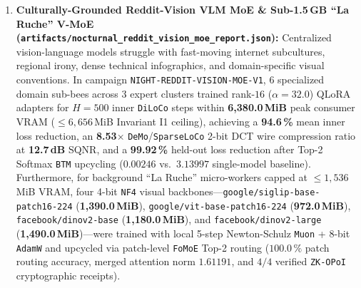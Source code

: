 \documentclass[11pt,a4paper]{article}
\begin{document}
\begin{enumerate}[leftmargin=1.8em]
    \item \textbf{Culturally-Grounded Reddit-Vision VLM MoE \& Sub-1.5\,GB ``La Ruche'' V-MoE (\texttt{artifacts/\allowbreak nocturnal\_\allowbreak reddit\_\allowbreak vision\_\allowbreak moe\_\allowbreak report.json}):}
    Centralized vision-language models struggle with fast-moving internet subcultures, regional irony, dense technical infographics, and domain-specific visual conventions. In campaign \texttt{NIGHT-REDDIT-VISION-MOE-V1}, 6 specialized domain sub-bees across 3 expert clusters trained rank-$16$ ($\alpha=32.0$) QLoRA adapters for $H=500$ inner \texttt{DiLoCo} steps within \textbf{6{,}380.0\,MiB} peak consumer VRAM ($\le 6{,}656$\,MiB Invariant I1 ceiling), achieving a \textbf{94.6\,\%} mean inner loss reduction, an \textbf{8.53$\times$} \texttt{DeMo}/\texttt{SparseLoCo} 2-bit DCT wire compression ratio at \textbf{12.7\,dB} SQNR, and a \textbf{99.92\,\%} held-out loss reduction after Top-2 Softmax \texttt{BTM} upcycling ($0.00246$ vs.\ $3.13997$ single-model baseline). Furthermore, for background ``La Ruche'' micro-workers capped at $\le 1{,}536$\,MiB VRAM, four 4-bit \texttt{NF4} visual backbones---\texttt{google/siglip-base-patch16-224} \cite{zhai2023siglip} (\textbf{1{,}390.0\,MiB}), \texttt{google/vit-base-patch16-224} (\textbf{972.0\,MiB}), \texttt{facebook/dinov2-base} \cite{oquab2023dinov2} (\textbf{1{,}180.0\,MiB}), and \texttt{facebook/dinov2-large} (\textbf{1{,}490.0\,MiB})---were trained with local 5-step Newton-Schulz \texttt{Muon} + 8-bit \texttt{AdamW} and upcycled via patch-level \texttt{FoMoE} Top-2 routing ($100.0\,\%$ patch routing accuracy, merged attention norm $1.61191$, and $4/4$ verified \texttt{ZK-OPoI} cryptographic receipts).


\end{enumerate}
\end{document}
